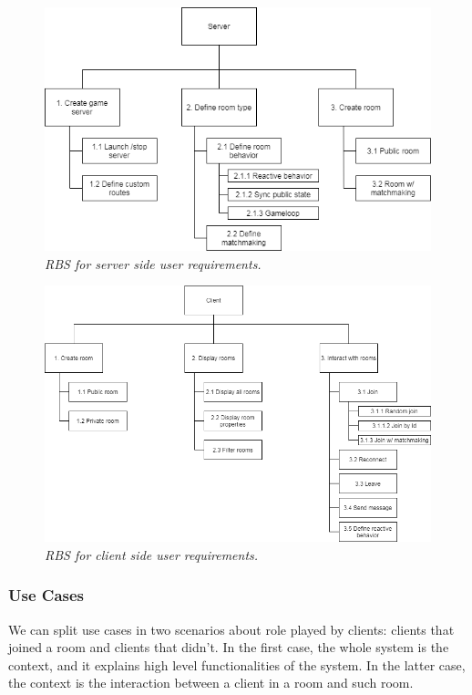 \begin{figure}[H]
  \includegraphics[scale=0.5]{images/2-scoping/server-RBS.png}
   \centering  
   \caption{\textit{RBS for server side user requirements.}}
  \label{fig:server-RBS}
\end{figure}

\begin{figure}[H]
  \includegraphics[scale=0.5]{images/2-scoping/client-RBS.png}
   \centering  
   \caption{\textit{RBS for client side user requirements.}}
  \label{fig:client-RBS}
\end{figure}
 
\subsubsection{Use Cases}

We can split use cases in two scenarios about role played by clients: clients that joined a room and clients that didn't. In the first case, the whole system is the context, and it explains high level functionalities of the system. In the latter case, the context is the interaction between a client in a room and such room.

